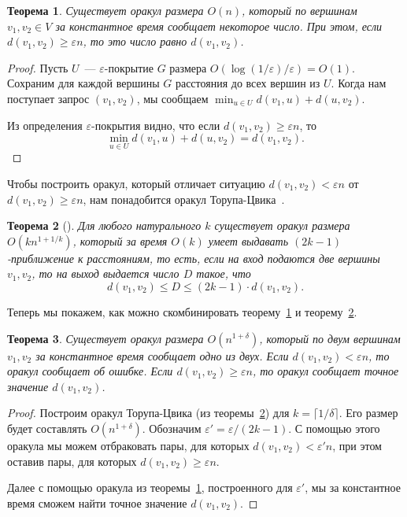 \documentclass[12pt]{article}
\newcommand{\eps}{\varepsilon}
\newtheorem{theorem}{Теорема}
\begin{document}
    \begin{theorem}
        \label{naive_oracle}
        Существует оракул размера $O(n)$, который по вершинам $v_1, v_2 \in V$ за константное время сообщает некоторое
        число. При этом, если $d(v_1, v_2) \geq \eps n$, то это число равно $d(v_1, v_2)$.
    \end{theorem}
    \begin{proof}
        Пусть $U$~--- $\eps$-покрытие $G$ размера $O(\log(1 / \eps) / \eps) = O(1)$.
        Сохраним для каждой вершины $G$ расстояния до всех вершин из $U$.
        Когда нам поступает запрос $(v_1, v_2)$, мы сообщаем $\min_{u \in U} d(v_1, u) + d(u, v_2)$.

        Из определения $\eps$-покрытия видно, что если $d(v_1, v_2) \geq \eps n$, то 
        $$
            \min_{u \in U} d(v_1, u) + d(u, v_2) = d(v_1, v_2).
        $$
    \end{proof}

    Чтобы построить оракул, который отличает ситуацию $d(v_1, v_2) < \eps n$ от $d(v_1, v_2) \geq \eps n$,
    нам понадобится оракул Торупа-Цвика~\cite{TZ05}.

    \begin{theorem}[\cite{TZ05}]
        \label{thorup_zwick}
        Для любого натурального $k$ существует оракул размера $O(kn^{1 + 1/k})$, который за время $O(k)$
        умеет выдавать $(2k - 1)$-приближение к расстояниям, то есть, если на вход подаются две вершины $v_1, v_2$,
        то на выход выдается число $D$ такое, что
        $$
            d(v_1, v_2) \leq D \leq (2k - 1) \cdot d(v_1, v_2).
        $$
    \end{theorem}

    Теперь мы покажем, как можно скомбинировать теорему~\ref{naive_oracle} и теорему~\ref{thorup_zwick}.

    \begin{theorem}
        Существует оракул размера $O(n^{1 + \delta})$, который по двум вершинам $v_1, v_2$ за константное время
        сообщает одно из двух.
        Если $d(v_1, v_2) < \eps n$, то оракул сообщает об ошибке. Если $d(v_1, v_2) \geq \eps n$,
        то оракул сообщает точное значение $d(v_1, v_2)$.
    \end{theorem}
    \begin{proof}
        Построим оракул Торупа-Цвика (из теоремы~\ref{thorup_zwick}) для $k = \lceil 1 / \delta \rceil$.
        Его размер будет составлять $O(n^{1 + \delta})$. Обозначим $\eps' = \eps / (2k - 1)$.
        С помощью этого оракула мы можем отбраковать пары, для которых $d(v_1, v_2) < \eps' n$, при этом
        оставив пары, для которых $d(v_1, v_2) \geq \eps n$.

        Далее с помощью оракула из теоремы~\ref{naive_oracle}, построенного для $\eps'$, мы за константное время
        сможем найти точное значение $d(v_1, v_2)$.
    \end{proof}
\end{document}
